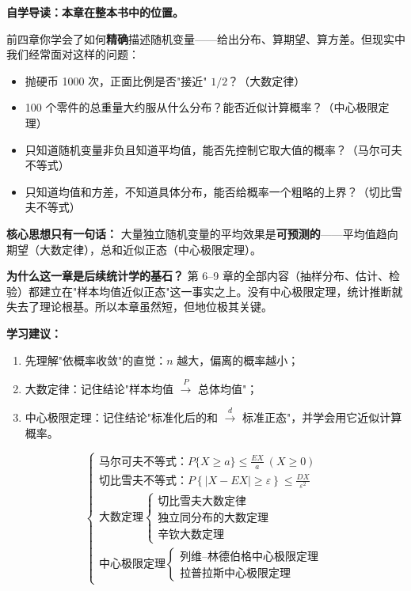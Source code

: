 ﻿\documentclass[lang=cn,11pt]{elegantbook}
\begin{document}
\begin{note}
\textbf{自学导读：本章在整本书中的位置。}

前四章你学会了如何\textbf{精确}描述随机变量——给出分布、算期望、算方差。但现实中我们经常面对这样的问题：
\begin{itemize}
    \item 抛硬币 1000 次，正面比例是否"接近" $1/2$？（大数定律）
    \item 100 个零件的总重量大约服从什么分布？能否近似计算概率？（中心极限定理）
    \item 只知道随机变量非负且知道平均值，能否先控制它取大值的概率？（马尔可夫不等式）
    \item 只知道均值和方差，不知道具体分布，能否给概率一个粗略的上界？（切比雪夫不等式）
\end{itemize}

\textbf{核心思想只有一句话：} 大量独立随机变量的平均效果是\textbf{可预测的}——平均值趋向期望（大数定律），总和近似正态（中心极限定理）。

\textbf{为什么这一章是后续统计学的基石？} 第 6--9 章的全部内容（抽样分布、估计、检验）都建立在"样本均值近似正态"这一事实之上。没有中心极限定理，统计推断就失去了理论根基。所以本章虽然短，但地位极其关键。

\textbf{学习建议：}
\begin{enumerate}
    \item 先理解"依概率收敛"的直觉：$n$ 越大，偏离的概率越小；
    \item 大数定律：记住结论"样本均值 $\xrightarrow{P}$ 总体均值"；
    \item 中心极限定理：记住结论"标准化后的和 $\xrightarrow{d}$ 标准正态"，并学会用它近似计算概率。
\end{enumerate}
\end{note}

\[
\begin{cases}
\text{马尔可夫不等式：} \displaystyle P\{X \geqslant a\} \leqslant \frac{EX}{a}\ (X\ge 0) \\[6pt]
\text{切比雪夫不等式：} \displaystyle P\left\{|X - EX| \geqslant \varepsilon\right\} \leq \frac{DX}{\varepsilon^2} \\[6pt]
\text{大数定理}
\begin{cases}
\text{切比雪夫大数定律} \\
\text{独立同分布的大数定理} \\
\text{辛钦大数定理}
\end{cases} \\[6pt]
\text{中心极限定理}
\begin{cases}
\text{列维--林德伯格中心极限定理} \\
\text{拉普拉斯中心极限定理}
\end{cases}
\end{cases}
\]
\end{document}
